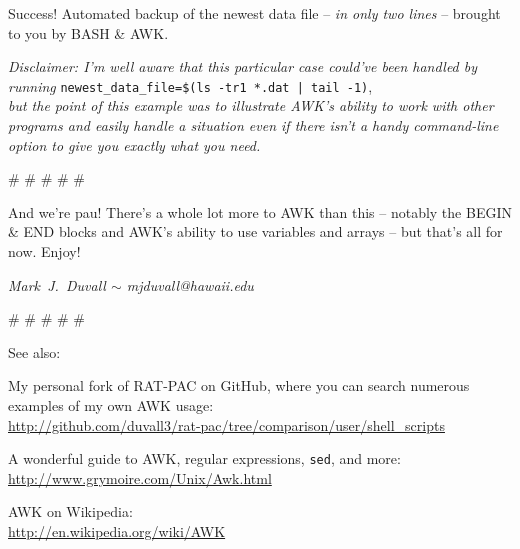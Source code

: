 \documentclass[10pt,a4]{article}
\begin{document}
\colorbox{black}{\color{white}{
run3.dat \qquad 100\% 273M 1.0MB/s 04:33
}}
\normalfont

Success! Automated backup of the newest data file -- \emph{in only two lines} -- brought to you by BASH \& AWK.

\scriptsize
\textit{Disclaimer: I'm well aware that this particular case could've been handled by running} \texttt{newest\_data\_file=\$(ls -tr1 *.dat | tail -1)},\\\textit{but the point of this example was to illustrate AWK's ability to work with other programs and easily handle a situation even if there isn't a handy command-line option to give you exactly what you need.}
\normalsize


\pagebreak


\# \# \# \# \#


And we're pau! There's a whole lot more to AWK than this -- notably the BEGIN \& END blocks and AWK's ability to use variables and arrays -- but that's all for now. Enjoy!


\emph{Mark~J.~Duvall $\sim$ mjduvall@hawaii.edu}


\# \# \# \# \#

See also:

My personal fork of RAT-PAC on GitHub, where you can search numerous examples of my own AWK usage:\\
\url{http://github.com/duvall3/rat-pac/tree/comparison/user/shell\_scripts}

A wonderful guide to AWK, regular expressions, \texttt{sed}, and more:\\
\url{http://www.grymoire.com/Unix/Awk.html}

AWK on Wikipedia:\\
\url{http://en.wikipedia.org/wiki/AWK}



\end{document}
